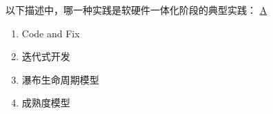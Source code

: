 \begin{problem}
	以下描述中，哪一种实践是软硬件一体化阶段的典型实践：
	\uline{A}    
    \vspace{-0.8em}
    \begin{multicols}{4}
        \begin{enumerate}[label=\Alph*.]
            \item Code and Fix
            \item 迭代式开发
            \item 瀑布生命周期模型
            \item 成熟度模型
        \end{enumerate}
    \end{multicols}
    \vspace{-1em}
\end{problem}

